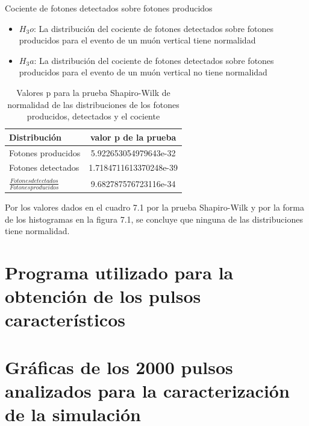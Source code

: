 \documentclass{book}
\begin{document}
Cociente de fotones detectados sobre fotones producidos
\begin{itemize}
\item $H_3o$: La distribuci\'on del cociente de fotones detectados sobre fotones producidos para el evento de un mu\'on vertical tiene normalidad
\item $H_3a$: La distribuci\'on del cociente de fotones detectados sobre fotones producidos para el evento de un mu\'on vertical no tiene normalidad
\end{itemize}

\begin{table}[h]
\caption{ Valores p para la prueba Shapiro-Wilk de normalidad de las distribuciones de los fotones producidos, detectados y el cociente}
\centering
\begin{tabular}{l | c}
\hline
Distribuci\'on & valor p de la prueba \\ \hline
Fotones producidos & 5.922653054979643e-32 \\
Fotones detectados & 1.7184711613370248e-39 \\
$\frac{Fotones detectados}{Fotones producidos}$ & 9.682787576723116e-34 \\

\hline
\end{tabular}
\end{table}

Por los valores dados en el cuadro 7.1 por la prueba Shapiro-Wilk y por la forma de los histogramas en la figura 7.1, se concluye que ninguna de las distribuciones tiene normalidad.

\section{Programa utilizado para la obtenci\'on de los pulsos caracter\'isticos}



\pagebreak
\section{Gr\'aficas de los 2000 pulsos analizados para la caracterizaci\'on de la simulaci\'on}
\end{document}
